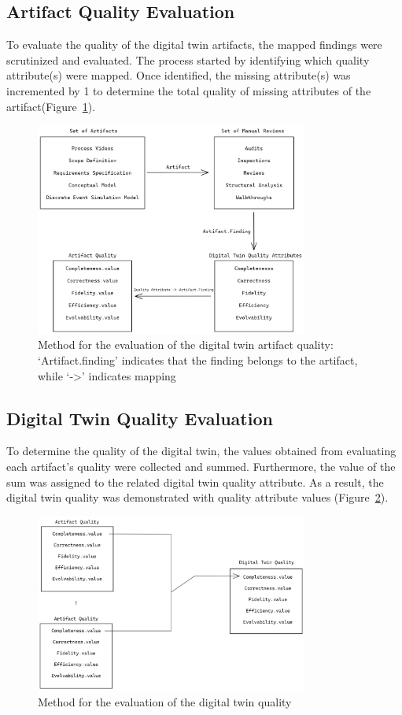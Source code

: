 \documentclass{llncs}
\begin{document}
    \subsection{Artifact Quality Evaluation}
    To evaluate the quality of the digital twin artifacts, the mapped findings were scrutinized and evaluated. 
    The process started by identifying which quality attribute(s) were mapped. 
    Once identified, the missing attribute(s) was incremented by 1 to determine the total quality of missing attributes of the artifact(Figure~\ref{fig:Method}).
    \begin{figure}[htbp]
        \centering
        \includegraphics[width = 0.8\textwidth]{RequirementSpecifications.png}
        \caption{Method for the evaluation of the digital twin artifact quality: `Artifact.finding' indicates that the finding belongs to the artifact, while `->' indicates mapping}\label{fig:Method}
    \end{figure}
    \subsection{Digital Twin Quality Evaluation}
    To determine the quality of the digital twin, 
    the values obtained from evaluating each artifact's quality were collected and summed. 
    Furthermore, the value of the sum was assigned to the related digital twin quality attribute. 
    As a result, the digital twin quality was demonstrated with quality attribute values (Figure~\ref{fig:MethodforDigitalTwinQuality}).
    \begin{figure}[htbp]
        \centering
        \includegraphics[width = 0.8\textwidth]{DigitalTwinQuality.png}
            \caption{Method for the evaluation of the digital twin quality}\label{fig:MethodforDigitalTwinQuality}
    \end{figure}
\end{document}

